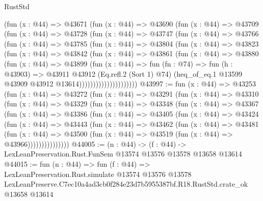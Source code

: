 \begin{lexlean}{RustStd}
\begin{coremodule}
                (fun (x : @44) =>
                @43671
                  (fun (x : @44) =>
                  @43690
                    (fun (x : @44) =>
                    @43709
                      (fun (x : @44) =>
                      @43728
                        (fun (x : @44) =>
                        @43747
                          (fun (x : @44) =>
                          @43766
                            (fun (x : @44) =>
                            @43785
                              (fun (x : @44) =>
                              @43804
                                (fun (x : @44) =>
                                @43823
                                  (fun (x : @44) =>
                                  @43842
                                    (fun (x : @44) =>
                                    @43861
                                      (fun (x : @44) =>
                                      @43880
                                        (fun (x : @44) =>
                                        @43899
                                          (fun (x : @44) =>
                                          fun (fn : @74) =>
                                          fun (h : @43903) =>
                                          @43911
                                            @43912
                                            (Eq.refl.{2} (Sort 1) @74)
                                            (heq_of_eq.{1}
                                              @13599
                                              @43909
                                              @43912
                                              @13614)))))))))))))))))))))
@43997 := fun (x : @44) =>
  @43253
    (fun (x : @44) =>
    @43272
      (fun (x : @44) =>
      @43291
        (fun (x : @44) =>
        @43310
          (fun (x : @44) =>
          @43329
            (fun (x : @44) =>
            @43348
              (fun (x : @44) =>
              @43367
                (fun (x : @44) =>
                @43386
                  (fun (x : @44) =>
                  @43405
                    (fun (x : @44) =>
                    @43424
                      (fun (x : @44) =>
                      @43443
                        (fun (x : @44) =>
                        @43462
                          (fun (x : @44) =>
                          @43481
                            (fun (x : @44) =>
                            @43500 (fun (x : @44) => @43519 (fun (x : @44) => @43966)))))))))))))))
@44005 := (n : @44) ->
  (f : @44) -> LexLeanPreservation.Rust.FunSem @13574 @13576 @13578 @13658 @13614
@44015 := fun (n : @44) =>
  fun (f : @44) =>
  LexLeanPreservation.Rust.simulate
    @13574
    @13576
    @13578
    LexLeanPreserve.C7ec10a4ad3cb0f284e23d7b5955387bf.R18.RustStd.crate_ok
    @13658
    @13614
\end{coremodule}
\end{lexlean}
